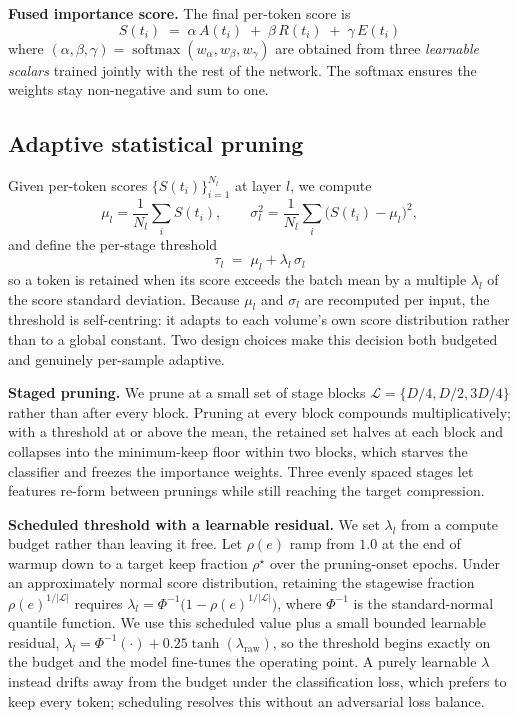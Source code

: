 \documentclass[journal]{IEEEtran}
\DeclareMathOperator*{\softmax}{softmax}
\begin{document}
\textbf{Fused importance score.} The final per-token score is
\begin{equation}
    \boxed{\;
        S(t_i) \;=\; \alpha\, A(t_i) \;+\; \beta\, R(t_i) \;+\; \gamma\, E(t_i)
    \;}
\end{equation}
where $(\alpha,\beta,\gamma) = \softmax(w_\alpha, w_\beta, w_\gamma)$ are
obtained from three \emph{learnable scalars} trained jointly with the rest of
the network. The softmax ensures the weights stay non-negative and sum to one.

\subsection{Adaptive statistical pruning}\label{ssec:threshold}
Given per-token scores $\{S(t_i)\}_{i=1}^{N_l}$ at layer $l$, we compute
\begin{equation}
    \mu_l = \frac{1}{N_l} \sum_i S(t_i),
    \qquad
    \sigma_l^2 = \frac{1}{N_l} \sum_i \big(S(t_i) - \mu_l\big)^2,
\end{equation}
and define the per-stage threshold
\begin{equation}
    \boxed{\; \tau_l \;=\; \mu_l + \lambda_l\, \sigma_l \;}
\end{equation}
so a token is retained when its score exceeds the batch mean by a multiple
$\lambda_l$ of the score standard deviation. Because $\mu_l$ and $\sigma_l$
are recomputed per input, the threshold is self-centring: it adapts to each
volume's own score distribution rather than to a global constant. Two design
choices make this decision both budgeted and genuinely per-sample adaptive.

\textbf{Staged pruning.} We prune at a small set of stage blocks
$\mathcal{L} = \{D/4, D/2, 3D/4\}$ rather than after every block. Pruning at
every block compounds multiplicatively; with a threshold at or above the
mean, the retained set halves at each block and collapses into the
minimum-keep floor within two blocks, which starves the classifier and
freezes the importance weights. Three evenly spaced stages let features
re-form between prunings while still reaching the target compression.

\textbf{Scheduled threshold with a learnable residual.} We set $\lambda_l$
from a compute budget rather than leaving it free. Let $\rho(e)$ ramp from
$1.0$ at the end of warmup down to a target keep fraction $\rho^\star$ over
the pruning-onset epochs. Under an approximately normal score distribution,
retaining the stagewise fraction $\rho(e)^{1/|\mathcal{L}|}$ requires
$\lambda_l = \Phi^{-1}\!\big(1-\rho(e)^{1/|\mathcal{L}|}\big)$, where
$\Phi^{-1}$ is the standard-normal quantile function. We use this scheduled
value plus a small bounded learnable residual,
$\lambda_l = \Phi^{-1}(\cdot) + 0.25\tanh(\lambda_{\text{raw}})$, so the
threshold begins exactly on the budget and the model fine-tunes the operating
point. A purely learnable $\lambda$ instead drifts away from the budget under
the classification loss, which prefers to keep every token; scheduling
resolves this without an adversarial loss balance.
\end{document}
